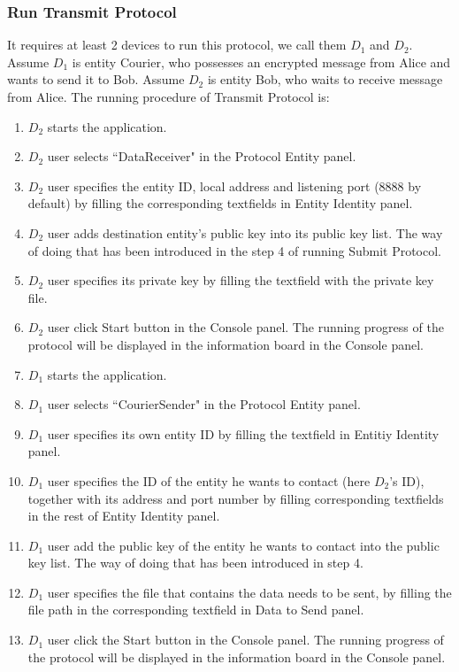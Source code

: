 \subsubsection{Run Transmit Protocol}
It requires at least 2 devices to run this protocol, we call them $ D_1 $ and $ D_2 $. Assume $ D_1 $ is entity Courier, who possesses an encrypted message from Alice and wants to send it to Bob. Assume $ D_2 $ is entity Bob, who waits to receive message from Alice. The running procedure of Transmit Protocol is:

\begin{enumerate}
\item $ D_2 $ starts the application.

\item $ D_2 $ user selects ``DataReceiver" in the Protocol Entity panel.

\item $ D_2 $ user specifies the entity ID, local address and listening port (8888 by default) by filling the corresponding textfields in Entity Identity panel.

\item $ D_2 $ user adds destination entity's public key into its public key list. The way of doing that has been introduced in the step 4 of running Submit Protocol.

\item $ D_2 $ user specifies its private key by filling the textfield with the private key file.

\item $ D_2 $ user click Start button in the Console panel. The running progress of the protocol will be displayed in the information board in the Console panel.

\item $ D_1 $ starts the application.

\item $ D_1 $ user selects ``CourierSender" in the Protocol Entity panel.

\item $ D_1 $ user specifies its own entity ID by filling the textfield in Entitiy Identity panel.

\item $ D_1 $ user specifies the ID of the entity he wants to contact (here $ D_2 $'s ID), together with its address and port number by filling corresponding textfields in the rest of Entity Identity panel.

\item $ D_1 $ user add the public key of the entity he wants to contact into the public key list. The way of doing that has been introduced in step 4.

\item $ D_1 $ user specifies the file that contains the data needs to be sent, by filling the file path in the corresponding textfield in Data to Send panel.

\item $ D_1 $ user click the Start button in the Console panel. The running progress of the protocol will be displayed in the information board in the Console panel.
\end{enumerate}
